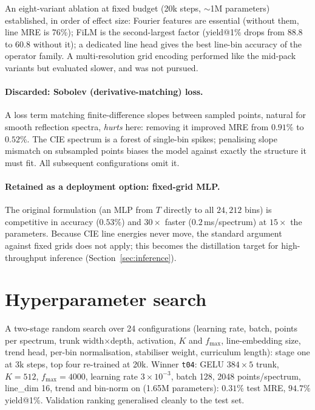 \documentclass[11pt,a4paper]{article}
\newcommand{\code}[1]{\texttt{#1}}
\begin{document}
An eight-variant ablation at fixed budget (20k steps, $\sim$1M
parameters) established, in order of effect size: Fourier features are
essential (without them, line MRE is 76\%); FiLM is the second-largest
factor (yield@1\% drops from 88.8 to 60.8 without it); a dedicated
line head gives the best line-bin accuracy of the operator family.
A multi-resolution grid encoding \citep[Instant-NGP style;][]{muller22}
performed like the mid-pack variants but evaluated slower, and was not
pursued.

\paragraph{Discarded: Sobolev (derivative-matching) loss.} A loss term
matching finite-difference slopes between sampled points, natural for
smooth reflection spectra, \emph{hurts} here: removing it improved MRE
from $0.91\%$ to $0.52\%$. The CIE spectrum is a forest of
single-bin spikes; penalising slope mismatch on subsampled points
biases the model against exactly the structure it must fit. All
subsequent configurations omit it.

\paragraph{Retained as a deployment option: fixed-grid MLP.} The
original formulation (an MLP from $T$ directly to all $24{,}212$ bins)
is competitive in accuracy ($0.53\%$) and $30\times$ faster
($0.2$\,ms/spectrum) at $15\times$ the parameters. Because CIE line
energies never move, the standard argument against fixed grids does not
apply; this becomes the distillation target for high-throughput
inference (Section~\ref{sec:inference}).

\section{Hyperparameter search}
\label{sec:hpo}

A two-stage random search \citep{bergstra12} over 24 configurations
(learning rate, batch, points per spectrum, trunk width$\times$depth,
activation, $K$ and $f_{\max}$, line-embedding size, trend head,
per-bin normalisation, stabiliser weight, curriculum length): stage one
at 3k steps, top four re-trained at 20k. Winner \code{t04}: GELU
$384\times5$ trunk, $K=512$, $f_{\max}=4000$, learning rate $3\times
10^{-3}$, batch 128, 2048 points/spectrum, line\_dim 16, trend and
bin-norm on (1.65M parameters): $0.31\%$ test MRE, $94.7\%$ yield@1\%.
Validation ranking generalised cleanly to the test set.
\end{document}

